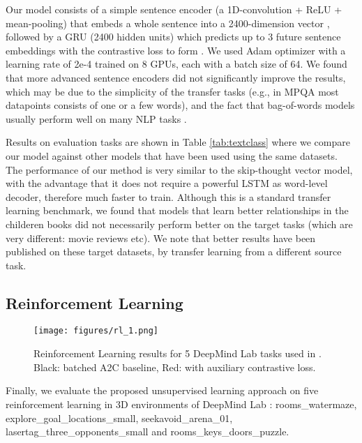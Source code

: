 Our model consists of a simple sentence encoder  (a 1D-convolution + ReLU + mean-pooling) that embeds a whole sentence into a 2400-dimension vector , followed by a GRU (2400 hidden units) which predicts up to 3 future sentence embeddings with the contrastive loss to form . We used Adam optimizer with a learning rate of 2e-4 trained on 8 GPUs, each with a batch size of 64. We found that more advanced sentence encoders did not significantly improve the results, which may be due to the simplicity of the transfer tasks (e.g., in MPQA most datapoints consists of one or a few words), and the fact that bag-of-words models usually perform well on many NLP tasks \cite{wang2012nlpclassification}.

Results on evaluation tasks are shown in Table \ref{tab:textclass} where we compare our model against other models that have been used using the same datasets. The performance of our method is very similar to the skip-thought vector model, with the advantage that it does not require a powerful LSTM as word-level decoder, therefore much faster to train. Although this is a standard transfer learning benchmark, we found that models that learn better relationships in the childeren books did not necessarily perform better on the target tasks (which are very different: movie reviews etc). We note that better  \cite{zhao2015self,radford2017learning} results have been published on these target datasets, by transfer learning from a different source task.

\subsection{Reinforcement Learning}

\begin{figure*}[t]
  \texttt{[image: figures/rl\_1.png]}
  \caption{Reinforcement Learning results for 5 DeepMind Lab tasks used in \cite{lasse2018impala}. Black: batched A2C baseline, Red: with auxiliary contrastive loss.}
  \label{fig:dmlab_rl}
  \vspace{-0.3cm}
\end{figure*}

Finally, we evaluate the proposed unsupervised learning approach on five reinforcement learning in 3D environments of DeepMind Lab \cite{beattie2016deepmind}: \mbox{rooms\_watermaze}, \mbox{explore\_goal\_locations\_small}, \mbox{seekavoid\_arena\_01}, \mbox{lasertag\_three\_opponents\_small} and \mbox{rooms\_keys\_doors\_puzzle}.

